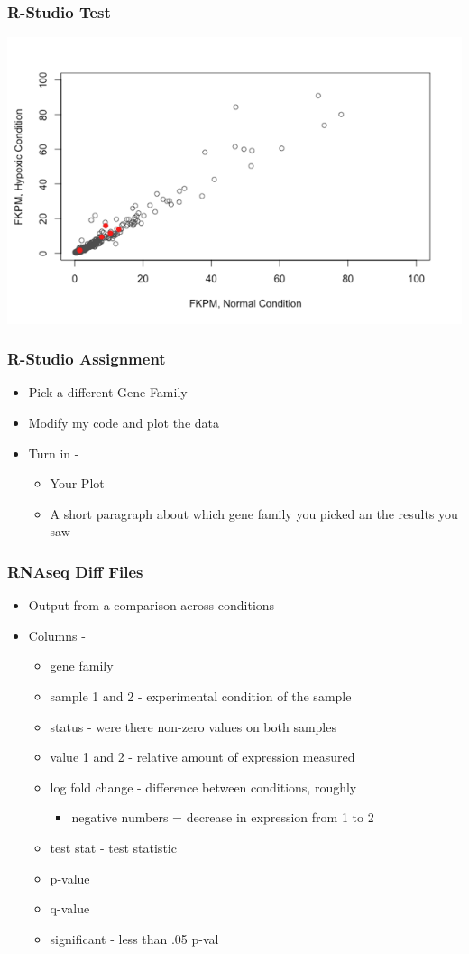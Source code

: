 \documentclass[14pt]{beamer}
\begin{document}
\begin{frame}
\frametitle{R-Studio Test}
\includegraphics[width=0.8\linewidth]{images_20170831_rstudioplot.png}
\end{frame}

\begin{frame}
\frametitle{R-Studio Assignment}
\begin{itemize}
	\item Pick a different Gene Family
	\item Modify my code and plot the data
	\item Turn in -
	\begin{itemize}
		\item Your Plot
		\item A short paragraph about which gene family you picked an the results you saw
	\end{itemize}
\end{itemize}
\end{frame}

\begin{frame}
\frametitle{RNAseq Diff Files}
\begin{itemize}
	\item Output from a comparison across conditions
	\item Columns -
	\begin{itemize}
		\item gene family
		\item sample 1 and 2 - experimental condition of the sample
		\item status - were there non-zero values on both samples
		\item value 1 and 2 - relative amount of expression measured
		\item log fold change - difference between conditions, roughly
		\begin{itemize}
			\item negative numbers = decrease in expression from 1 to 2
		\end{itemize}
		\item test stat - test statistic
		\item p-value
		\item q-value
		\item significant - less than .05 p-val
	\end{itemize}
\end{itemize}
\end{frame}
\end{document}
